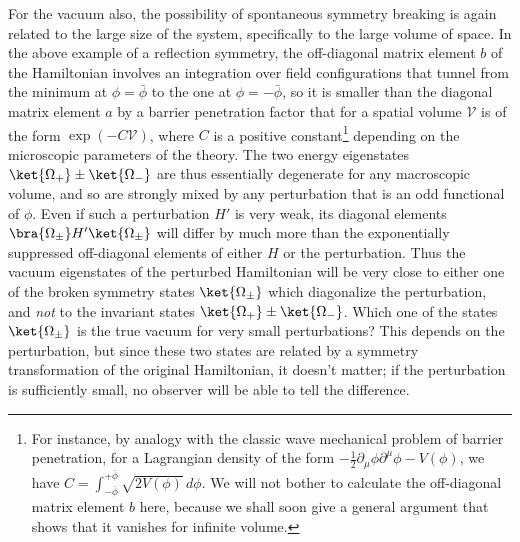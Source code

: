 For the vacuum also, the possibility of spontaneous symmetry breaking is
again related to the large size of the system, specifically to the large
volume of space. In the above example of a reflection symmetry, the
off-diagonal matrix element $b$ of the Hamiltonian involves an integration
over field configurations that tunnel from the minimum at $\phi=\bar\phi$ to
the one at $\phi=-\bar\phi$, so it is smaller than the diagonal matrix element
$a$ by a barrier penetration factor that for a spatial volume $\mathcal V$ is
of the form $\exp(-C\mathcal V)$, where $C$ is a positive
constant\footnote{For instance, by analogy with the classic wave mechanical
problem of barrier penetration, for a Lagrangian density of the form
$-\frac{1}{2}\partial_\mu\phi\partial^\mu\phi-V(\phi)$, we have
$C=\int_{-\bar\phi}^{+\bar\phi}\sqrt{2V(\phi)}\,d\phi$. We will not bother to
calculate the off-diagonal matrix element $b$ here, because we shall soon give
a general argument that shows that it vanishes for infinite volume.}
depending on the microscopic parameters of the theory. The two energy
eigenstates $\ket{\Omega_+}\pm\ket{\Omega_-}$ are thus essentially degenerate
for any macroscopic volume, and so are strongly mixed by any perturbation
that is an odd functional of $\phi$. Even if such a perturbation $H'$ is very
weak, its diagonal elements $\bra{\Omega_\pm}H'\ket{\Omega_\pm}$ will differ
by much more than the exponentially suppressed off-diagonal elements of
either $H$ or the perturbation. Thus the vacuum eigenstates of the perturbed
Hamiltonian will be very close to either one of the broken symmetry states
$\ket{\Omega_\pm}$ which diagonalize the perturbation, and \emph{not} to the
invariant states $\ket{\Omega_+}\pm\ket{\Omega_-}$. Which one of the states
$\ket{\Omega_\pm}$ is the true vacuum for very small perturbations? This
depends on the perturbation, but since these two states are related by a
symmetry transformation of the original Hamiltonian, it doesn't matter; if
the perturbation is sufficiently small, no observer will be able to tell the
difference.

